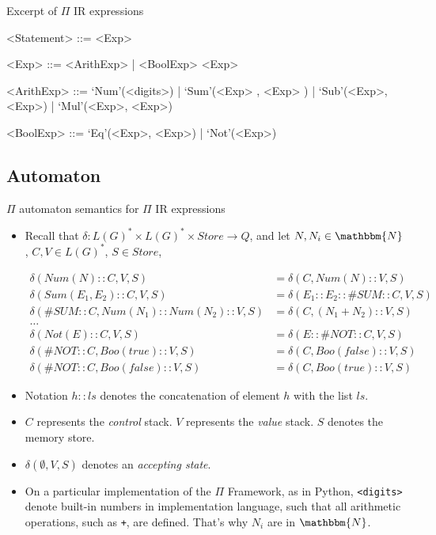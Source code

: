 \documentclass{beamer}
\begin{document}

\begin{frame}{Excerpt of  {\color{red}$\Pi$ IR} expressions}

\begin{grammar}
<Statement>  ::=  <Exp> 

<Exp>        ::=  <ArithExp> | <BoolExp> <Exp> 

<ArithExp>  ::=  `Num'(<digits>) | `Sum'(<Exp> , <Exp> ) |  `Sub'(<Exp>, <Exp>) | `Mul'(<Exp>, <Exp>) 

<BoolExp>  ::=  `Eq'(<Exp>, <Exp>) | `Not'(<Exp>)
\end{grammar}

\end{frame}

\subsection{Automaton}


\begin{frame}[allowframebreaks]{{\color{red}$\Pi$ automaton} semantics for {\color{red}$\Pi$ IR} expressions}
\begin{itemize}
\item Recall that $\delta : L(G)^* \times L(G)^* \times Store \to Q$, and let $N, N_i \in \mathbbm{N}$, $C, V \in L(G)^*$, $S \in \mathit{Store}$,
\begin{scriptsize}
\begin{align}
\delta(Num(N) :: C, V, S) & = \delta(C, Num(N) :: V, S) \\
\delta(Sum(E_1, E_2) :: C, V, S) & = \delta(E_1 :: E_2 :: \#SUM :: C, V, S) \\
\delta(\#SUM :: C, Num(N_1) :: Num(N_2) :: V, S) & = \delta(C, (N_1 + N_2) :: V, S) \\
\ldots \nonumber \\
\delta(Not(E) :: C, V, S) & = \delta(E :: \#NOT :: C, V, S) \\
\delta(\#NOT :: C, Boo(true) :: V, S) & = \delta(C, Boo(false) :: V, S) \\
\delta(\#NOT :: C, Boo(false) :: V, S) & = \delta(C, Boo(true) :: V, S) 
\end{align}
\end{scriptsize}

\item Notation $h :: ls$ denotes the concatenation of element $h$ with the list $ls$. 

\item $C$ represents the \emph{control} stack. $V$ represents the \emph{value} stack. $S$ denotes the memory store.

\item $\delta(\emptyset, V, S)$ denotes an \emph{accepting state}.

\item On a particular implementation of the $\Pi$ Framework, as in Python, \texttt{<digits>}
denote built-in numbers in implementation language, such that all arithmetic operations, such as \texttt{+}, are defined. 
That's why $N_i$ are in $\mathbbm{N}$.
\end{itemize}
\end{frame}
\end{document}
